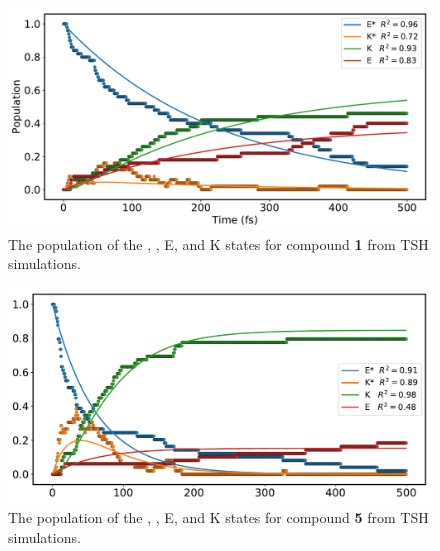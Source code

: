 \begin{figure}[t]
\centering
  \includegraphics[width=0.9\linewidth]{3nonradiativedecay/HC_1_global_fit.pdf}
  \caption[Global fit for enol and keto states for \textbf{HC1} in TSH simulations]{The population of the \Estar{}, \Kstar{}, E, and K states for compound \textbf{1} from \ac{TSH} simulations.}
  \label{figure: HC_1_Global}
\end{figure}
\begin{figure}[t]
\centering
  \includegraphics[width=0.9\linewidth]{3nonradiativedecay/HC_5_global_fit.pdf}
  \caption[Global fit for enol and keto states for \textbf{HC5} in TSH simulations]{The population of the \Estar{}, \Kstar{}, E, and K states for compound \textbf{5} from \ac{TSH} simulations.}
  \label{figure: HC_5_Global}
\end{figure}

